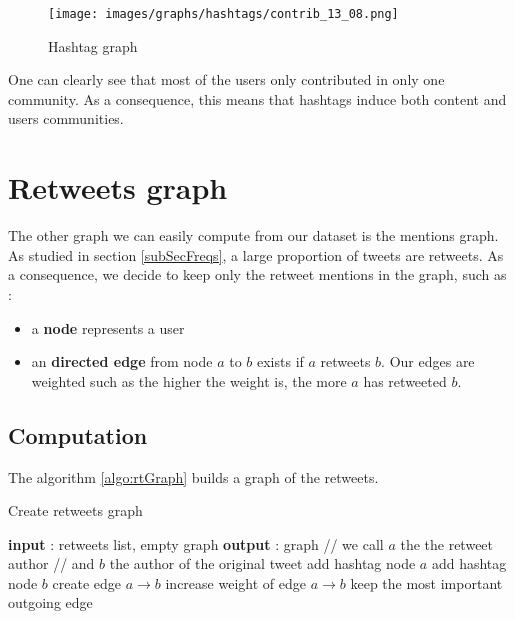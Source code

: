 \documentclass[a4paper,twoside,12pt,openright]{report}
\begin{document}
\begin{figure}[H]
\centering
\texttt{[image: images/graphs/hashtags/contrib\_13\_08.png]}
\caption{Hashtag graph}
\label{contribGraph}
\end{figure}

One can clearly see that most of the users only contributed in only one community. As a consequence, this means that hashtags induce both content and users communities.

\newpage

\section{Retweets graph}
The other graph we can easily compute from our dataset is the mentions graph. As studied in section \ref{subSecFreqs}, a large proportion of tweets are retweets. As a consequence, we decide to keep only the retweet mentions in the graph, such as :
\begin{itemize}
\item a \textbf{node} represents a user
\item an \textbf{directed edge} from node $a$ to $b$ exists if $a$ retweets $b$. Our edges are weighted such as the higher the weight is, the more $a$ has retweeted $b$.
\end{itemize}

\subsection{Computation}

The algorithm \ref{algo:rtGraph} builds a graph of the retweets.

\begin{algorithm}
\caption{Create retweets graph}
\label{algo:rtGraph}
\begin{algorithmic} 
\STATE \textbf{input} : retweets list, empty graph
\STATE \textbf{output} : graph
	\STATE // we call $a$ the the retweet author
	\STATE // and $b$ the author of the original tweet
	\STATE add hashtag node $a$
	\ENDIF
	\STATE add hashtag node $b$
	\ENDIF
	\STATE create edge $a \rightarrow b$
	\ELSE
	\STATE increase weight of edge $a \rightarrow b$
	\ENDIF
\ENDFOR
{}
	\STATE keep the most important outgoing edge
\ENDFOR
\end{algorithmic}
\end{algorithm}
\end{document}
